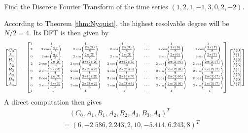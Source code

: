 \begin{exmp}
Find the Discrete Fourier Transform of the time series $(1,2,1,-1,3,0,2,-2)$.
\end{exmp}
\begin{solution}
According to Theorem \ref{thm:Nyquist}, the highest resolvable degree will be $N/2 = 4$. Its DFT is then given by
\begin{align*}
\scriptsize
\begin{bmatrix}
C_0 \\
A_1 \\
B_1 \\
A_2 \\
B_2 \\
A_3 \\
B_3 \\
A_4
\end{bmatrix}
&= 
\tiny
\begin{bmatrix}
1 & 1 & 1 & 1 & \cdots & 1 & 1 \\
2 & 2\cos(\frac{2\pi}{8}) & 2\cos(\frac{2\pi(2)}{8}) & 2\cos(\frac{2\pi(3)}{8}) & \cdots & 2\cos(\frac{2\pi(6)}{8}) & 2\cos(\frac{2\pi(7)}{8}) \\
0 & 2\sin(\frac{2\pi}{8}) & 2\sin(\frac{2\pi(2)}{8}) & 2\sin(\frac{2\pi(3)}{8}) & \cdots & 2\sin(\frac{2\pi(6)}{8}) & 2\sin(\frac{2\pi(7)}{8}) \\
2 & 2\cos(\frac{2\pi(2)}{8}) & 2\cos(\frac{2\pi(2)(2)}{8}) & 2\cos(\frac{2\pi(2)(3)}{8}) & \cdots & 2\cos(\frac{2\pi(2)(6)}{8}) & 2\cos(\frac{2\pi(2)(7)}{8}) \\
0 & 2\sin(\frac{2\pi(2)}{8}) & 2\sin(\frac{2\pi(2)(2)}{8}) & 2\sin(\frac{2\pi(2)(3)}{8}) & \cdots & 2\sin(\frac{2\pi(2)(6)}{8}) & 2\sin(\frac{2\pi(2)(7)}{8}) \\
2 & 2\cos(\frac{2\pi(3)}{8}) & 2\cos(\frac{2\pi(3)(2)}{8}) & 2\cos(\frac{2\pi(3)(3)}{8}) & \cdots & 2\cos(\frac{2\pi(3)(6)}{8}) & 2\cos(\frac{2\pi(3)(7)}{8}) \\
0 & 2\sin(\frac{2\pi(3)}{8}) & 2\sin(\frac{2\pi(3)(2)}{8}) & 2\sin(\frac{2\pi(3)(3)}{8}) & \cdots & 2\sin(\frac{2\pi(3)(6)}{8}) & 2\sin(\frac{2\pi(3)(7)}{8}) \\
1 & -1 & 1 & -1 & \cdots & 1 & -1
\end{bmatrix}
\scriptsize
\begin{bmatrix}
f(0)\\
f(1)\\
f(2)\\
f(3)\\
f(4)\\
f(5)\\
f(6)\\
f(7)
\end{bmatrix}     
\end{align*}
A direct computation then gives 
\begin{align*}
&\quad (C_0, A_1, B_1, A_2, B_2, A_3, B_3, A_4)^T \\
&= (6, -2.586, 2.243, 2, 10, -5.414, 6.243, 8)^T
\end{align*}
\end{solution}

